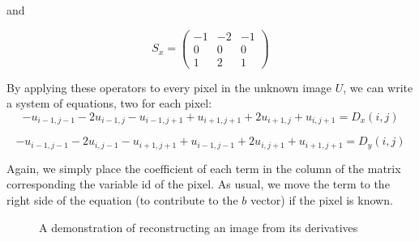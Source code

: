 \documentclass{InsightArticle}
\begin{document}
and

\begin{equation}
S_x =
\begin{pmatrix}
-1 & -2 & -1 \\
0 & 0 & 0\\
1 & 2 & 1
\end{pmatrix}
\end{equation}

By applying these operators to every pixel in the unknown image $U$, we can write a system of equations, two for each pixel:
\begin{equation}
- u_{i-1,j-1} -2 u_{i-1,j} - u_{i-1,j+1} + u_{i+1,j+1} + 2 u_{i+1,j} + u_{i,j+1} = D_x(i,j)
\end{equation}

\begin{equation}
- u_{i-1,j-1} -2 u_{i,j-1} - u_{i+1,j+1} + u_{i-1,j-1} + 2 u_{i,j+1} + u_{i+1,j+1} = D_y(i,j)
\end{equation}

Again, we simply place the coefficient of each term in the column of the matrix corresponding the variable id of the pixel. As usual, we move the term to the right side of the equation (to contribute to the $b$ vector) if the pixel is known.

\begin{figure}[H]
\centering
{}
\caption{A demonstration of reconstructing an image from its derivatives}
\label{fig:DerivativeReconstruction}
\end{figure}
\end{document}
